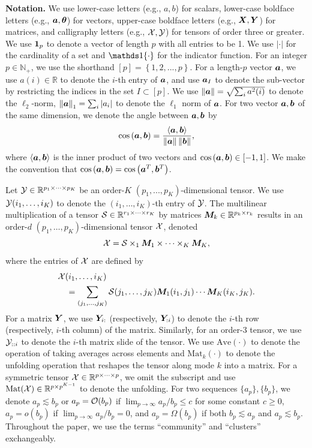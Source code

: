 \documentclass[journal]{IEEEtran}
\theoremstyle{definition}
\theoremstyle{definition}
\newcommand{\of}[1]{\left(#1\right)}
\newcommand{\offf}[1]{\left\{#1\right\}}
\newcommand{\ang}[1]{\left\langle#1\right\rangle}
\begin{document}
{\bf Notation.} We use lower-case letters (e.g., $a,b$) for scalars, lower-case boldface letters (e.g., $\bm{a},\boldsymbol{\theta}$) for vectors, upper-case boldface letters (e.g., $\bm X,\bm Y$) for matrices, and calligraphy letters (e.g., $\mathcal{X},\mathcal{Y}$) for tensors of order three or greater. We use $\mathbf{1}_p$ to denote a vector of length $p$ with all entries to be 1. We use $|\cdot|$ for the cardinality of a set and $\ind\{\cdot\}$ for the indicator function. For an integer $p\in\mathbb{N}_{+}$, we use the shorthand $[p]= \offf{1,2,...,p}$. For a length-$p$ vector $\bm{a}$, we use $a(i)\in\mathbb{R}$ to denote the $i$-th entry of $\bm{a}$, and use $\bm{a}_{I}$ to denote the sub-vector by restricting the indices in the set $I\subset [p]$.  We use  $\left\lVert\bm{a}\right\rVert=\sqrt{\sum_{i}a^2(i)}$ to denote the $\ell_2$-norm, $\left\lVert\bm{a}\right\rVert_1=\sum_i |a_i|$ to denote the $\ell_1$ norm of $\bm{a}$. For two vector $\bm{a}, \bm{b}$ of the same dimension, we denote the angle between $\bm{a}, \bm{b}$ by 
\begin{equation}
    \cos \of{\ma, \mb} = \frac{\ang{ \ma, \mb}}{ \onorm{\ma} \onorm{\mb} },
\end{equation}
where $\ang{\ma,\mb}$ is the inner product of two vectors and $\cos \of{\ma, \mb} \in [-1,1]$. We make the convention that $\cos \of{\ma, \mb} = \cos \of{\ma^T, \mb^T}$. 

Let $\mathcal{Y}  \in \mathbb{R}^{p_1 \times \cdots \times p_K}$ be an order-$K$ $(p_1,...,p_K)$-dimensional tensor. We use $\mathcal{Y}(i_1,\ldots,i_K)$ to denote the $(i_1,\ldots,i_K)$-th entry of $\mathcal{Y}$. The multilinear multiplication of a tensor $\mathcal{S}\in \mathbb{R}^{r_1\times \cdots \times r_K}$ by matrices $\bm M_k \in\mathbb{R}^{p_k\times r_k}$ results in an order-$d$ $(p_1,\ldots,p_K)$-dimensional tensor $\mathcal{X}$, denoted
\[
\mathcal{X}=\mathcal{S} \times_1 \bm M_1 \times \cdots \times_K \bm M_K,
\]
where the entries of $\mathcal{X}$ are defined by
\small
\begin{align}
    &\mathcal{X}(i_1,\ldots, i_K) \\
    & \quad =\sum_{(j_1,\ldots,j_K)}\mathcal{S}(j_1,\ldots,j_K)\bm M_1(i_1,j_1)\cdots \bm M_K(i_K,j_K).
\end{align} 
\normalsize
For a matrix $\bm Y$, we use $\bm Y_{i:}$ (respectively, $\bm Y_{:i}$) to denote the $i$-th row (respectively, $i$-th column) of the matrix. Similarly, for an order-3 tensor, we use $\mathcal{Y}_{::i}$ to denote the $i$-th matrix slide of the tensor. We use $\text{Ave}(\cdot)$ to denote the operation of taking averages across elements and $\text{Mat}_k(\cdot)$ to denote the unfolding operation that reshapes the tensor along mode $k$ into a matrix.   {For a symmetric tensor $\mathcal{X} \in\mathbb{R}^{p\times \cdots \times p}$, we omit the subscript and use $\text{Mat}(\mathcal{X})\in\mathbb{R}^{p\times p^{K-1}}$ to denote the unfolding.}  For two sequences $\{a_p\}, \{b_p\}$, we denote $a_p\lesssim b_p$ or $a_p=\mathcal{O}(b_p)$ if $\lim_{p\to\infty}a_p /b_p\leq c$ for some constant $c\geq 0$, $a_p=o(b_p)$ if $\lim_{p\to\infty}a_p/b_p =0$, and $a_p = \Omega(b_p)$ if both $b_p \lesssim a_p$ and $a_p\lesssim b_p$. Throughout the paper, we use the terms ``community'' and ``clusters'' exchangeably. 
\end{document}
